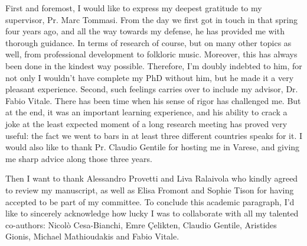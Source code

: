 First and foremost, I would like to express my deepest gratitude to my
supervisor, Pr. Marc Tommasi. From the day we first got in touch in that spring
four years ago, and all the way towards my defense, he has provided me with
thorough guidance. In terms of research of course, but on many other topics as
well, from professional development to folkloric music. Moreover, this has
always been done in the kindest way possible. Therefore, I'm doubly indebted to
him, for not only I wouldn't have complete my PhD without him, but he made it a
very pleasant experience. Second, such feelings carries over to include my
advisor, Dr. Fabio Vitale. There has been time when his sense of
rigor has challenged me. But at the end, it was an important learning
experience, and his ability to crack a joke at the least expected moment of a
long research meeting has proved very useful: the fact we went to bars in at
least three different countries speaks for it. I would also like to thank Pr.
Claudio Gentile for hosting me in Varese, and giving me sharp advice along
those three years.

Then I want to thank Alessandro Provetti and Liva Ralaivola who kindly agreed
to review my manuscript, as well as Elisa Fromont and Sophie Tison for having
accepted to be part of my committee.
%
To conclude this academic paragraph, I'd like to sincerely acknowledge how
lucky I was to collaborate with all my talented co-authors: Nicolò
Cesa-Bianchi, Emre Çelikten, Claudio Gentile, Aristides Gionis, Michael Mathioudakis and Fabio
Vitale.

\medskip

